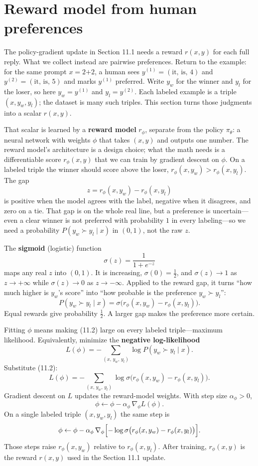 \section{Reward model from human preferences}

The policy-gradient update in Section 11.1 needs a reward $r(x,y)$ for each full reply. What we collect instead are pairwise preferences. Return to the example: for the same prompt $x=\text{2+2}$, a human sees $y^{(1)}=(\text{it},\,\text{is},\,4)$ and $y^{(2)}=(\text{it},\,\text{is},\,5)$ and marks $y^{(1)}$ preferred. Write $y_w$ for the winner and $y_l$ for the loser, so here $y_w=y^{(1)}$ and $y_l=y^{(2)}$. Each labeled example is a triple $(x,y_w,y_l)$; the dataset is many such triples. This section turns those judgments into a scalar $r(x,y)$.

That scalar is learned by a \textbf{reward model} $r_\phi$, separate from the policy $\pi_\theta$: a neural network with weights $\phi$ that takes $(x,y)$ and outputs one number. The reward model's architecture is a design choice; what the math needs is a differentiable score $r_\phi(x,y)$ that we can train by gradient descent on $\phi$. On a labeled triple the winner should score above the loser, $r_\phi(x,y_w)>r_\phi(x,y_l)$. The gap \[
z=r_\phi(x,y_w)-r_\phi(x,y_l)
\] is positive when the model agrees with the label, negative when it disagrees, and zero on a tie. That gap is on the whole real line, but a preference is uncertain---even a clear winner is not preferred with probability $1$ in every labeling---so we need a probability $P(y_w\succ y_l\mid x)$ in $(0,1)$, not the raw $z$.

The \textbf{sigmoid} (logistic) function \[
\sigma(z)=\frac{1}{1+e^{-z}}
\] maps any real $z$ into $(0,1)$. It is increasing, $\sigma(0)=\tfrac12$, and $\sigma(z)\to 1$ as $z\to+\infty$ while $\sigma(z)\to 0$ as $z\to-\infty$. Applied to the reward gap, it turns ``how much higher is $y_w$'s score'' into ``how probable is the preference $y_w\succ y_l$'': \begin{equation}
P(y_w\succ y_l\mid x)
=
\sigma\bigl(r_\phi(x,y_w)-r_\phi(x,y_l)\bigr).
\tag{11.2}
\end{equation} Equal rewards give probability $\tfrac12$. A larger gap makes the preference more certain.

Fitting $\phi$ means making (11.2) large on every labeled triple---maximum likelihood. Equivalently, minimize the \textbf{negative log-likelihood} \[
L(\phi)
=
-\sum_{(x,\,y_w,\,y_l)}
\log P(y_w\succ y_l\mid x).
\] Substitute (11.2): \begin{equation}
L(\phi)
=
-\sum_{(x,\,y_w,\,y_l)}
\log\sigma\bigl(r_\phi(x,y_w)-r_\phi(x,y_l)\bigr).
\tag{11.3}
\end{equation} Gradient descent on $L$ updates the reward-model weights. With step size $\alpha_\phi>0$, \[
\phi
\leftarrow
\phi-\alpha_\phi\,\nabla_\phi L(\phi).
\] On a single labeled triple $(x,y_w,y_l)$ the same step is \[
\phi
\leftarrow
\phi-\alpha_\phi\,\nabla_\phi\Bigl[-\log\sigma\bigl(r_\phi(x,y_w)-r_\phi(x,y_l)\bigr)\Bigr].
\] Those steps raise $r_\phi(x,y_w)$ relative to $r_\phi(x,y_l)$. After training, $r_\phi(x,y)$ is the reward $r(x,y)$ used in the Section 11.1 update.

